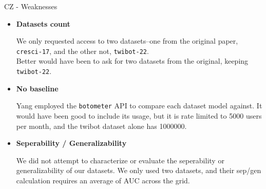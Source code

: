 \documentclass[aspectratio=169, 10pt]{beamer}
\begin{document}
\begin{frame}{CZ - Weaknesses}
  \begin{itemize}
    \item \textbf{Datasets count}
      \begin{indentedblock}
        \small We only requested access to two datasets--one from the original paper, \texttt{cresci-17}, and the other not, \texttt{twibot-22}.\\
        Better would have been to ask for two datasets from the original, keeping \texttt{twibot-22}.
      \end{indentedblock}
    \item \textbf{No baseline}
      \begin{indentedblock}
        \small Yang employed the \texttt{botometer} API to compare each dataset model against. It would have been good to include its usage, but it is rate limited to 5000 users per month, and the twibot dataset alone has 1000000.
      \end{indentedblock}
    \item \textbf{Seperability / Generalizability}
      \begin{indentedblock}
        \small We did not attempt to characterize or evaluate the seperability or generalizability of our datasets. We only used two datasets, and their sep/gen calculation requires an average of AUC across the grid.
      \end{indentedblock}
  \end{itemize}
\end{frame}
\end{document}
